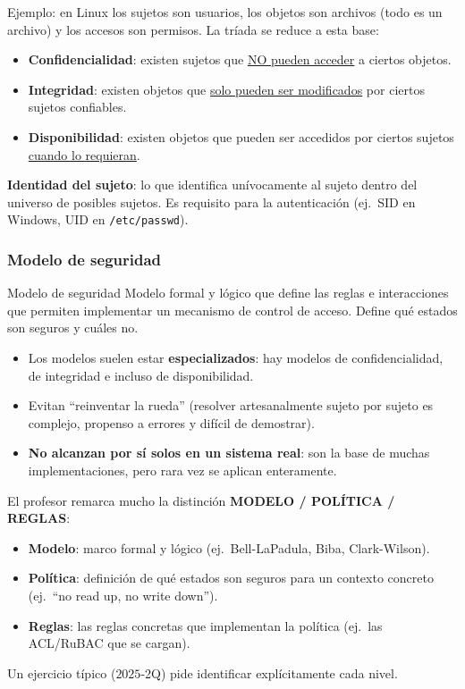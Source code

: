 \documentclass[../main.tex]{subfiles}
\begin{document}
Ejemplo: en Linux los sujetos son usuarios, los objetos son archivos (todo es un archivo) y los accesos son permisos. La tríada se reduce a esta base:
\begin{itemize}[nosep]
  \item \textbf{Confidencialidad}: existen sujetos que \underline{NO pueden acceder} a ciertos objetos.
  \item \textbf{Integridad}: existen objetos que \underline{solo pueden ser modificados} por ciertos sujetos confiables.
  \item \textbf{Disponibilidad}: existen objetos que pueden ser accedidos por ciertos sujetos \underline{cuando lo requieran}.
\end{itemize}

\textbf{Identidad del sujeto}: lo que identifica unívocamente al sujeto dentro del universo de posibles sujetos. Es requisito para la autenticación (ej.\ SID en Windows, UID en \texttt{/etc/passwd}).

\subsubsection{Modelo de seguridad}

\begin{definicion}{Modelo de seguridad}
Modelo formal y lógico que define las reglas e interacciones que permiten implementar un mecanismo de control de acceso. Define qué estados son seguros y cuáles no.
\end{definicion}

\begin{itemize}[nosep]
  \item Los modelos suelen estar \textbf{especializados}: hay modelos de confidencialidad, de integridad e incluso de disponibilidad.
  \item Evitan ``reinventar la rueda'' (resolver artesanalmente sujeto por sujeto es complejo, propenso a errores y difícil de demostrar).
  \item \textbf{No alcanzan por sí solos en un sistema real}: son la base de muchas implementaciones, pero rara vez se aplican enteramente.
\end{itemize}

\begin{destacado}
El profesor remarca mucho la distinción \textbf{MODELO / POLÍTICA / REGLAS}:
\begin{itemize}[nosep]
  \item \textbf{Modelo}: marco formal y lógico (ej.\ Bell-LaPadula, Biba, Clark-Wilson).
  \item \textbf{Política}: definición de qué estados son seguros para un contexto concreto (ej.\ ``no read up, no write down'').
  \item \textbf{Reglas}: las reglas concretas que implementan la política (ej.\ las ACL/RuBAC que se cargan).
\end{itemize}
Un ejercicio típico ($2025$-2Q) pide identificar explícitamente cada nivel.
\end{destacado}
\end{document}
